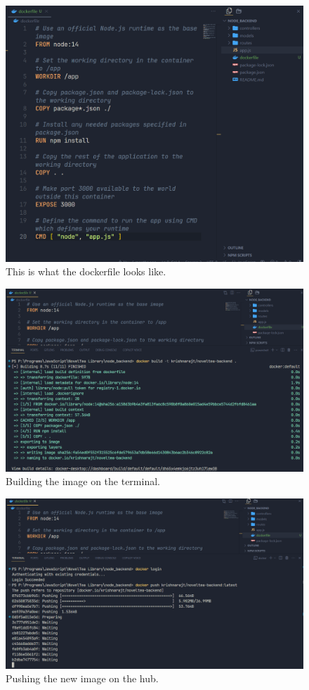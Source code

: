 \documentclass[11pt]{article}
\begin{document}
\begin{figure}[H]
    \centering
    \includegraphics[width=.95\textwidth]{dockerfile and path.png}
    \caption{This is what the dockerfile looks like. }
\end{figure}

\begin{figure}[H]
    \centering
    \includegraphics[width=.95\textwidth]{building docker.png}
    \caption{Building the image on the terminal. }
\end{figure}

\begin{figure}[H]
    \centering
    \includegraphics[width=.95\textwidth]{pushing to hub.png}
    \caption{Pushing the new image on the hub.}
\end{figure}
\end{document}
